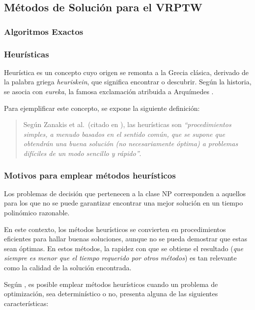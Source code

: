 \documentclass[12pt,titlepage,twoside,openright]{book}
\begin{document}
\subsection{Métodos de Solución para el VRPTW}
\subsubsection{Algoritmos Exactos}

\subsubsection{Heurísticas}

Heurística es un concepto cuyo origen se remonta a la Grecia clásica, derivado de la palabra griega \textit{heuriskein}, que significa encontrar o descubrir. Según la historia, se asocia con \textit{eureka}, la famosa exclamación atribuida a Arquímedes \citep{antonioSuarez2014}.

Para ejemplificar este concepto, se expone la siguiente definición:

\begin{quote}
	Según Zanakis et al.\ (citado en \citep{duarte2007metaheuristicas}), las heurísticas son \textit{``procedimientos simples, a menudo basados en el sentido común, que se supone que obtendrán una buena solución (no necesariamente óptima) a problemas difíciles de un modo sencillo y rápido''}.
\end{quote}

\subsubsection*{Motivos para emplear métodos heurísticos}

Los problemas de decisión que pertenecen a la clase NP corresponden a aquellos para los que no se puede garantizar encontrar una mejor solución en un tiempo polinómico razonable.

En este contexto, los métodos heurísticos se convierten en procedimientos eficientes para hallar buenas soluciones, aunque no se pueda demostrar que estas sean óptimas. En estos métodos, la rapidez con que se obtiene el resultado (\textit{que siempre es menor que el tiempo requerido por otros métodos}) es tan relevante como la calidad de la solución encontrada.

Según \citep{antonioSuarez2014}, es posible emplear métodos heurísticos cuando un problema de optimización, sea determinístico o no, presenta alguna de las siguientes características:
\end{document}
